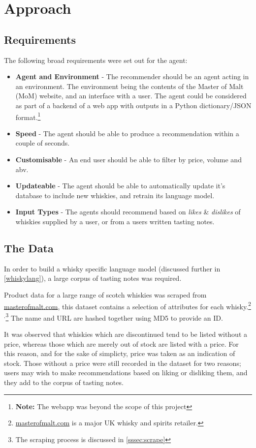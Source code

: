 \section{Approach}\label{sec:approach}
\subsection{Requirements}
The following broad requirements were set out for the agent:
\begin{itemize}
    \item \textbf{Agent and Environment} - The recommender should be an agent acting in an environment. 
    The environment being the contents of the Master of Malt (MoM) website, and an interface with a user.
    The agent could be considered as part of a backend of a web app with outputs in a Python dictionary/JSON
    format.\footnote{\textbf{Note:} The webapp was beyond the scope of this project}
    \item \textbf{Speed} - The agent should be able to produce a recommendation
    within a couple of seconds.
    \item \textbf{Customisable} - An end user should be able to filter by price,
    volume and abv.
    \item \textbf{Updateable} - The agent should be able to automatically update
    it's database to include new whiskies, and retrain its language model.
    \item \textbf{Input Types} - The agents should recommend based on \emph{likes} 
    \& \emph{dislikes} of whiskies supplied by a user, or from a users written 
    tasting notes.
\end{itemize}

\subsection{The Data}
In order to build a whisky specific language model (discussed further in
\autoref{whiskylang}), a large corpus of tasting notes was required.

Product data for a large range of scotch whiskies was scraped from
\href{http://masterofmalt.com/}{masterofmalt.com}, this dataset contains a selection of attributes for each 
whisky.\footnote{\href{http://masterofmalt.com/}{masterofmalt.com} is a major UK whisky and spirits retailer.}$^{,}$\footnote{The scraping process is discussed in \autoref{sssec:scrape}}
The name and URL are hashed together using MD5 to provide an ID.

It was observed that whiskies which are discontinued tend to be listed
without a price, whereas those which are merely out of stock are listed with a
price.  For this reason, and for the sake of simplicty, price was taken as an
indication of stock.  Those without a price
were still recorded in the dataset for two reasons; users may wish to make recommendations
based on liking or disliking them, and they add to the corpus of tasting notes.

